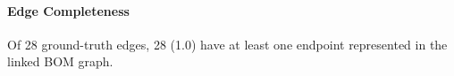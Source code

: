 \paragraph{Edge Completeness}
Of 28 ground-truth edges, 28 (1.0) have at least one endpoint represented in the linked BOM graph.